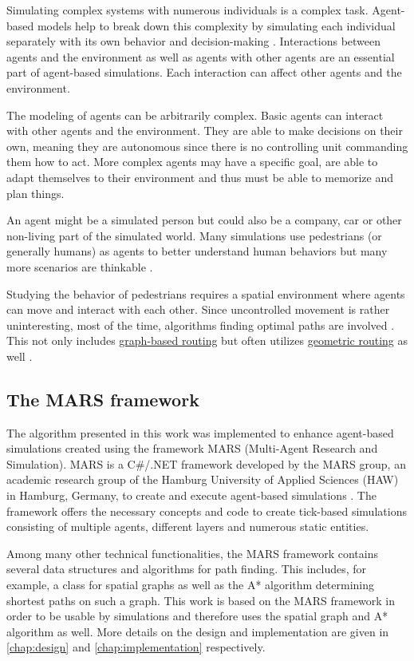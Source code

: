 	Simulating complex systems with numerous individuals is a complex task.
	Agent-based models help to break down this complexity by simulating each individual separately with its own behavior and decision-making \cite{macal-introductory-tutorial}.
	Interactions between agents and the environment as well as agents with other agents are an essential part of agent-based simulations.
	Each interaction can affect other agents and the environment.
	
	The modeling of agents can be arbitrarily complex.
	Basic agents can interact with other agents and the environment.
	They are able to make decisions on their own, meaning they are autonomous since there is no controlling unit commanding them how to act.
	More complex agents may have a specific goal, are able to adapt themselves to their environment and thus must be able to memorize and plan things.
	
	An agent might be a simulated person but could also be a company, car or other non-living part of the simulated world.
	Many simulations use pedestrians (or generally humans) as agents to better understand human behaviors but many more scenarios are thinkable \cite{macal-introductory-tutorial}.

	Studying the behavior of pedestrians requires a spatial environment where agents can move and interact with each other.
	Since uncontrolled movement is rather uninteresting, most of the time, algorithms finding optimal paths are involved \cite{kneidl-borrmann-hartmann-navigation,gloor-hybrid-pedestrian-routing,teknomo-millonig-routing}.
	This not only includes \hyperref[sec:graph-routing]{graph-based routing} but often utilizes \hyperref[sec:geometric-routing]{geometric routing} as well \cite{kneidl-borrmann-hartmann-navigation}.
	
	\subsection{The MARS framework}
	
		The algorithm presented in this work was implemented to enhance agent-based simulations created using the framework MARS (Multi-Agent Research and Simulation).
		MARS is a C\#/.NET framework developed by the MARS group, an academic research group of the Hamburg University of Applied Sciences (HAW) in Hamburg, Germany, to create and execute agent-based simulations \cite{mars}.
		The framework offers the necessary concepts and code to create tick-based simulations consisting of multiple agents, different layers and numerous static entities.
		
		Among many other technical functionalities, the MARS framework contains several data structures and algorithms for path finding.
		This includes, for example, a class for spatial graphs as well as the A* algorithm determining shortest paths on such a graph.
		This work is based on the MARS framework in order to be usable by simulations and therefore uses the spatial graph and A* algorithm as well.
		More details on the design and implementation are given in \cref{chap:design} and \ref{chap:implementation} respectively.